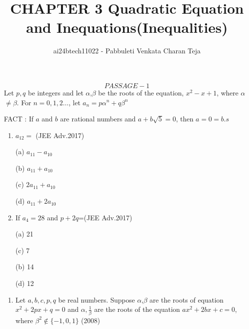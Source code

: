\documentclass[journal,12pt,twocolumn]{IEEEtran}
\title{CHAPTER 3 Quadratic Equation and Inequations(Inequalities)}
\date{}
\theoremstyle{remark}
\begin{document}

\vspace{3cm}

\author{ai24btech11022 - Pabbuleti Venkata Charan Teja}
\maketitle
\newpage
\bigskip

\renewcommand{\thefigure}{\theenumi}
\renewcommand{\thetable}{\theenumi}

$$PASSAGE-1$$
Let $p,q$ be integers and let $\alpha$,$\beta$ be the roots of the equation,
$x^{2}-x+1$, where $\alpha$$\neq$$\beta$. For $n=0,1,2\dots$, let ${a_{n}=p\alpha^{n}+q\beta^{n}}$

FACT : If $a$ and $b$ are rational numbers and $a+b\sqrt{5}=0$, then $a=0=b.s$
\begin{enumerate}
    
\item
$a_{12}=$ \hfill(JEE Adv.2017)


(a) $a_{11}-a_{10}$

(b) $a_{11}+a_{10}$

(c) $2a_{11}+a_{10}$

(d) $a_{11}+2a_{10}$
\item 
If $a_{4}=28$ and $p+2q$=\hfill(JEE Adv.2017)

\end{enumerate}

\begin{multicols}{2}

\begin{enumerate}

\item[(a)] 
21
\item[(c)] 
7
\item[(b)] 
14
\item[(d)] 
12

\end{enumerate}

\end{multicols}

\begin{enumerate}
\item 
Let $a,b,c,p,q$ be real numbers. Suppose $\alpha$,$\beta$ are the roots of equation ${x^{2}+2px+q=0}$ and $\alpha,\frac{1}{\beta}$ are the roots of  the equation ${ax^{2}+2bx+c=0}$, where $\beta^{2}\not\in\{-1,0,1\}$ \hfill(2008)

\end{enumerate}
\end{document}
